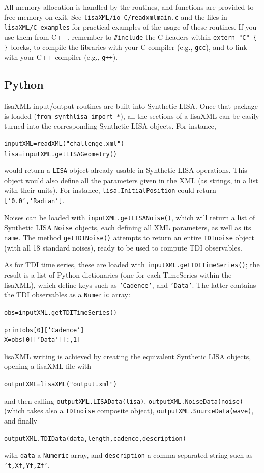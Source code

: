 \documentclass[11pt]{report}
\begin{document}
All memory allocation is handled by the routines, and functions are provided to free memory on exit. See \texttt{lisaXML/io-C/readxmlmain.c} and the files in \texttt{lisaXML/C-examples} for practical examples of the usage of these routines. If you use them from C++, remember to \texttt{\#include} the C headers within \texttt{extern "C" \{ \}} blocks, to compile the libraries with your C compiler (e.g., \texttt{gcc}), and to link with your C++ compiler (e.g., \texttt{g++}).

\subsection{Python}

lisaXML input/output routines are built into Synthetic LISA. Once that package is loaded (\texttt{from synthlisa import *}), all the sections of a lisaXML can be easily turned into the corresponding Synthetic LISA objects. For instance,
%
\begin{alltt}
inputXML = readXML("challenge.xml")
lisa = inputXML.getLISAGeometry()
\end{alltt}
%
would return a \texttt{LISA} object already usable in Synthetic LISA operations. This object would also define all the parameters given in the XML (as strings, in a list with their units). For instance, \texttt{lisa.InitialPosition} could return \texttt{['0.0','Radian']}.

Noises can be loaded with \texttt{inputXML.getLISANoise()}, which will return a list of Synthetic LISA \texttt{Noise} objects, each defining all XML parameters, as well as its \texttt{name}. The method \texttt{getTDINoise()} attempts to return an entire \texttt{TDInoise} object (with all 18 standard noises), ready to be used to compute TDI observables.

As for TDI time series, these are loaded with \texttt{inputXML.getTDITimeSeries()}; the result is a list of Python dictionaries (one for each TimeSeries within the lisaXML), which define keys such as \texttt{'Cadence'}, and \texttt{'Data'}. The latter contains the TDI observables as a \texttt{Numeric} array:
%
\begin{alltt}
obs = inputXML.getTDITimeSeries()

print obs[0]['Cadence'] 
X = obs[0]['Data'][:,1]
\end{alltt}

lisaXML writing is achieved by creating the equivalent Synthetic LISA objects, opening a lisaXML file with
%
\begin{alltt}
outputXML = lisaXML("output.xml")
\end{alltt}
%
and then calling \texttt{outputXML.LISAData(lisa)},
\texttt{outputXML.NoiseData(noise)} (which takes also a \texttt{TDInoise} composite object), \texttt{outputXML.SourceData(wave)}, and finally
%
\begin{alltt}
outputXML.TDIData(data,length,cadence,description)
\end{alltt}
%
with \texttt{data} a \texttt{Numeric} array, and \texttt{description} a comma-separated string such as \texttt{'t,Xf,Yf,Zf'}.
\end{document}
